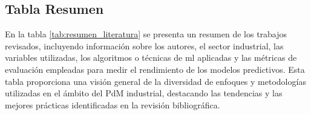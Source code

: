 \documentclass[IB]{TFUOC}
\begin{document}
\subsection{Tabla Resumen}

En la tabla \ref{tab:resumen_literatura} se presenta un resumen de los trabajos revisados, incluyendo información sobre
los autores, el sector industrial, las variables utilizadas, los algoritmos o técnicas de \gls{ml} aplicadas y las
métricas de evaluación empleadas para medir el rendimiento de los modelos predictivos. Esta tabla proporciona una visión
general de la diversidad de enfoques y metodologías utilizadas en el ámbito del \gls{PdM} industrial, destacando las
tendencias y las mejores prácticas identificadas en la revisión bibliográfica.

\begingroup
\scriptsize
\setlength{\LTcapwidth}{\textwidth}
\end{document}
